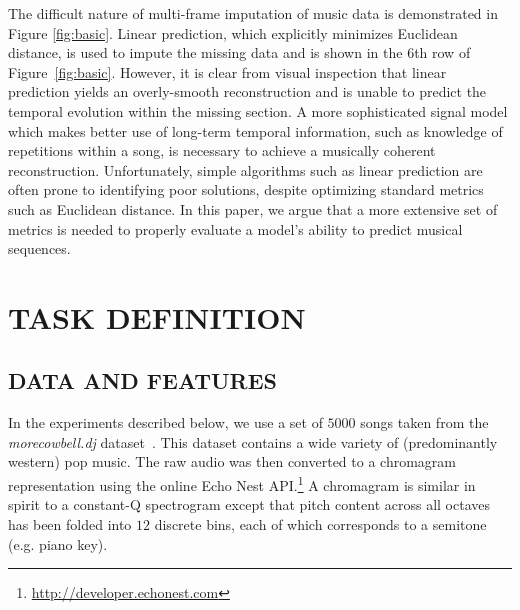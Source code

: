 \documentclass{article}
\begin{document}
The difficult nature of multi-frame imputation of music data is
demonstrated in Figure \ref{fig:basic}.  Linear prediction, which
explicitly minimizes Euclidean distance, is used to impute the missing
data and is shown in the $6$th row of Figure~\ref{fig:basic}.
However, it is clear from visual inspection that linear prediction
yields an overly-smooth reconstruction and is unable to predict the
temporal evolution within the missing section.
%
A more sophisticated signal model which makes better use of long-term temporal information, 
such as knowledge of repetitions within a song, 
is necessary to achieve a musically coherent reconstruction.
%
Unfortunately, simple algorithms such as linear prediction are often
prone to identifying poor solutions, despite optimizing standard
metrics such as Euclidean distance.
%
In this paper, we argue that a more extensive set of metrics is needed
to properly evaluate a model's ability to predict musical sequences.


\section{TASK DEFINITION}
\label{sec:task}

\subsection{DATA AND FEATURES}
\label{ssec:feats}
In the experiments described below, we use a set of $5000$ songs taken
from the \emph{morecowbell.dj} dataset~\cite{Bertin-Mahieux2010a}.
This dataset contains a wide variety of (predominantly western) pop
music.  The raw audio was then converted to a chromagram
representation using the online Echo Nest
API.\footnote{\url{http://developer.echonest.com}} A chromagram is
similar in spirit to a \mbox{constant-Q} spectrogram except that pitch
content across all octaves has been folded into $12$ discrete bins,
each of which corresponds to a semitone (e.g. piano key).
%
\end{document}

